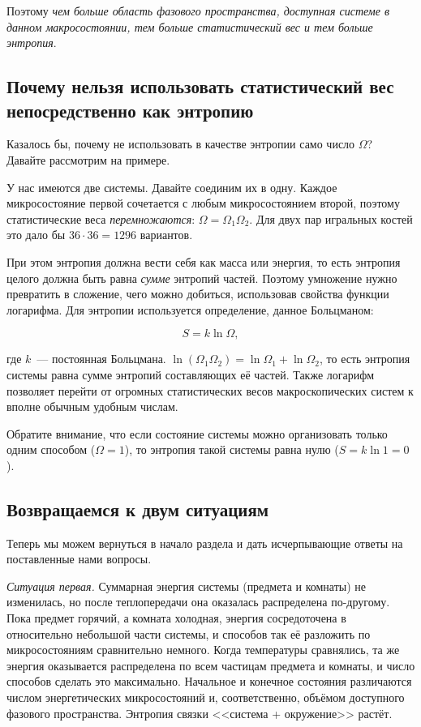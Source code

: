 Поэтому \emph{чем больше область фазового пространства, доступная системе в данном макросостоянии, тем больше статистический вес и тем больше энтропия}.

\subsection*{Почему нельзя использовать статистический вес непосредственно как энтропию}

Казалось бы, почему не использовать в качестве энтропии само число $\Omega$? Давайте рассмотрим на примере.

У нас имеются две системы. Давайте соединим их в одну. Каждое микросостояние первой сочетается с любым микросостоянием второй, поэтому статистические веса \emph{перемножаются}: $\Omega = \Omega_1 \Omega_2$. Для двух пар игральных костей это дало бы $36 \cdot 36 = 1296$ вариантов.

При этом энтропия должна вести себя как масса или энергия, то есть энтропия целого должна быть равна \emph{сумме} энтропий частей. Поэтому умножение нужно превратить в сложение, чего можно добиться, использовав свойства функции логарифма. Для энтропии используется определение, данное Больцманом:

\begin{equation*}
    \boxed{S = k \ln \Omega},
\end{equation*}

где $k$~--- постоянная Больцмана. $\ln (\Omega_1 \Omega_2) = \ln \Omega_1 + \ln \Omega_2$, то есть энтропия системы равна сумме энтропий составляющих её частей. Также логарифм позволяет перейти от огромных статистических весов макроскопических систем к вполне обычным удобным числам.

Обратите внимание, что если состояние системы можно организовать только одним способом ($\Omega = 1$), то энтропия такой системы равна нулю ($S = k \ln 1 = 0$).

\subsection*{Возвращаемся к двум ситуациям}

Теперь мы можем вернуться в начало раздела и дать исчерпывающие ответы на поставленные нами вопросы.

\emph{Ситуация первая.} Суммарная энергия системы (предмета и комнаты) не изменилась, но после теплопередачи она оказалась распределена по-другому. Пока предмет горячий, а комната холодная, энергия сосредоточена в относительно небольшой части системы, и способов так её разложить по микросостояниям сравнительно немного. Когда температуры сравнялись, та же энергия оказывается распределена по всем частицам предмета и комнаты, и число способов сделать это максимально. Начальное и конечное состояния различаются числом энергетических микросостояний и, соответственно, объёмом доступного фазового пространства. Энтропия связки <<система + окружение>> растёт.


